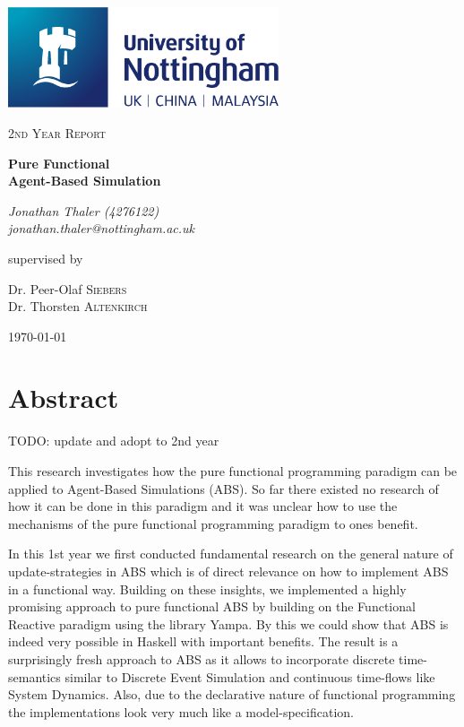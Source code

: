 \documentclass[oneside]{book}
\begin{document}
\begin{titlepage}
	\centering
	\includegraphics[width=0.60\textwidth]{./logo/UoN_Primary_Logo_RGB.png}\par\vspace{1cm}
	{\scshape\Large 2nd Year Report\par}
	\vspace{1.5cm}
	{\huge\bfseries Pure Functional \\ Agent-Based Simulation\par}
	\vspace{2cm}
	{\Large\itshape Jonathan Thaler (4276122) \\ jonathan.thaler@nottingham.ac.uk \par}
	\vfill
	supervised by\par
	Dr. Peer-Olaf \textsc{Siebers} \\
	Dr. Thorsten \textsc{Altenkirch}

	\vfill

	{\large \today\par}
\end{titlepage}

\cleardoublepage

\section*{Abstract}
TODO: update and adopt to 2nd year

This research investigates how the pure functional programming paradigm can be applied to Agent-Based Simulations (ABS). So far there existed no research of how it can be done in this paradigm and it was unclear how to use the mechanisms of the pure functional programming paradigm to ones benefit.

In this 1st year we first conducted fundamental research on the general nature of update-strategies in ABS which is of direct relevance on how to implement ABS in a functional way.
Building on these insights, we implemented a highly promising approach to pure functional ABS by building on the Functional Reactive paradigm using the library Yampa. By this we could show that ABS is indeed very possible in Haskell with important benefits. The result is a surprisingly fresh approach to ABS as it allows to incorporate discrete time-semantics similar to Discrete Event Simulation and continuous time-flows like System Dynamics. Also, due to the declarative nature of functional programming the implementations look very much like a model-specification.
\end{document}
